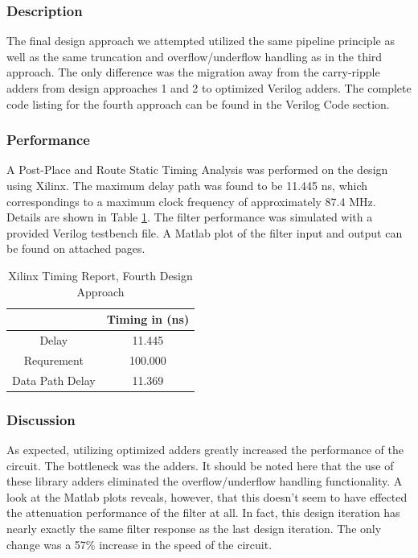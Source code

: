 \subsubsection*{Description}
The final design approach we attempted utilized the same pipeline principle as well as the same truncation and overflow/underflow handling as in the third approach. The only difference was the migration away from the carry-ripple adders from design approaches 1 and 2 to optimized Verilog adders. The complete code listing for the fourth approach can be found in the Verilog Code section.


\subsubsection*{Performance}
A Post-Place and Route Static Timing Analysis was performed on the design using Xilinx. The maximum delay path was found to be 11.445 ns, which correspondings to a maximum clock frequency of approximately 87.4 MHz. Details are shown in Table \ref{tab:timing4}. The filter performance was simulated with a provided Verilog testbench file. A Matlab plot of the filter input and output can be found on attached pages.

\begin{table}[h]
\begin{center}
\caption{Xilinx Timing Report, Fourth Design Approach}
\begin{tabular}{c|c}
           & Timing in (ns) \\
\hline
     Delay &   11.445  \\

Requrement &    100.000 \\

Data Path Delay & 11.369  \\
\end{tabular}  
\end{center}
\label{tab:timing4}
\end{table}

\subsubsection*{Discussion}
As expected, utilizing optimized adders greatly increased the performance of the circuit. The bottleneck was the adders. It should be noted here that the use of these library adders eliminated the overflow/underflow handling functionality. A look at the Matlab plots reveals, however, that this doesn't seem to have effected the attenuation performance of the filter at all. In fact, this design iteration has nearly exactly the same filter response as the last design iteration. The only change was a 57\% increase in the speed of the circuit.


